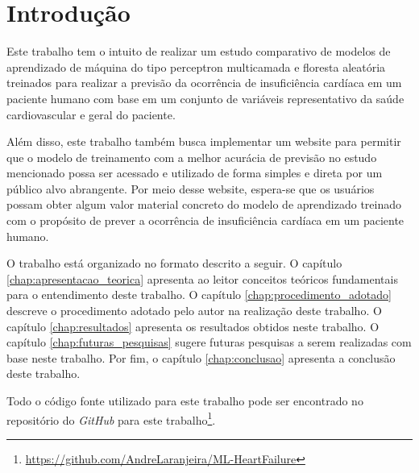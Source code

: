 \chapter{Introdução} \label{chap:introducao}

Este trabalho tem o intuito de realizar um estudo comparativo de modelos de aprendizado de máquina do tipo perceptron multicamada e floresta aleatória treinados para realizar a previsão da ocorrência de insuficiência cardíaca em um paciente humano com base em um conjunto de variáveis representativo da saúde cardiovascular e geral do paciente.

Além disso, este trabalho também busca implementar um website para permitir que o modelo de treinamento com a melhor acurácia de previsão no estudo mencionado possa ser acessado e utilizado de forma simples e direta por um público alvo abrangente. Por meio desse website, espera-se que os usuários possam obter algum valor material concreto do modelo de aprendizado treinado com o propósito de prever a ocorrência de insuficiência cardíaca em um paciente humano.

O trabalho está organizado no formato descrito a seguir. O capítulo \ref{chap:apresentacao_teorica} apresenta ao leitor conceitos teóricos fundamentais para o entendimento deste trabalho. O capítulo \ref{chap:procedimento_adotado} descreve o procedimento adotado pelo autor na realização deste trabalho. O capítulo \ref{chap:resultados} apresenta os resultados obtidos neste trabalho. O capítulo \ref{chap:futuras_pesquisas} sugere futuras pesquisas a serem realizadas com base neste trabalho. Por fim, o capítulo \ref{chap:conclusao} apresenta a conclusão deste trabalho.

Todo o código fonte utilizado para este trabalho pode ser encontrado no repositório do \textit{GitHub} para este trabalho\footnote{\url{https://github.com/AndreLaranjeira/ML-HeartFailure}}.
